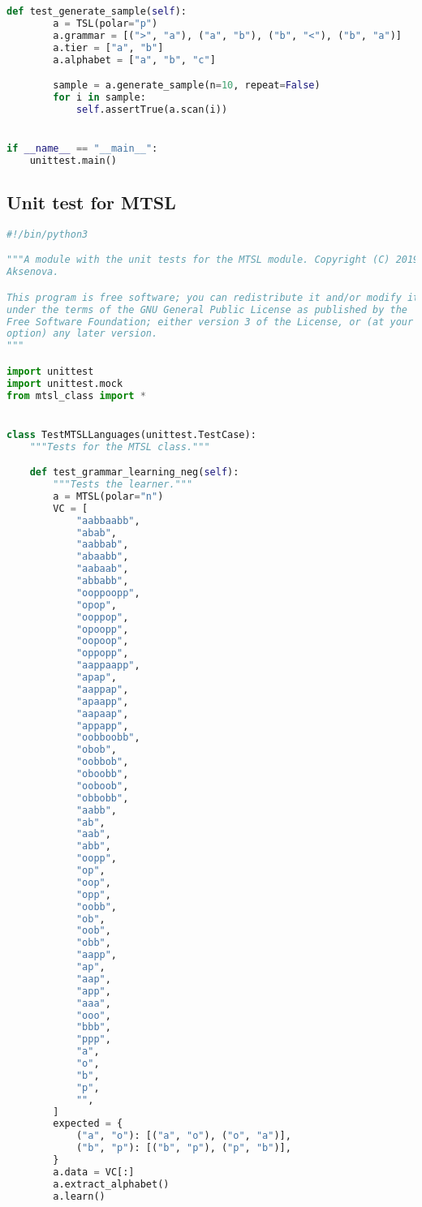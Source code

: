 \begin{lstlisting}[language=Python]
    def test_generate_sample(self):
        a = TSL(polar="p")
        a.grammar = [(">", "a"), ("a", "b"), ("b", "<"), ("b", "a")]
        a.tier = ["a", "b"]
        a.alphabet = ["a", "b", "c"]

        sample = a.generate_sample(n=10, repeat=False)
        for i in sample:
            self.assertTrue(a.scan(i))


if __name__ == "__main__":
    unittest.main()

\end{lstlisting}

\subsection*{Unit test for MTSL}

\begin{lstlisting}[language=Python]
#!/bin/python3

"""A module with the unit tests for the MTSL module. Copyright (C) 2019  Alena
Aksenova.

This program is free software; you can redistribute it and/or modify it
under the terms of the GNU General Public License as published by the
Free Software Foundation; either version 3 of the License, or (at your
option) any later version.
"""

import unittest
import unittest.mock
from mtsl_class import *


class TestMTSLLanguages(unittest.TestCase):
    """Tests for the MTSL class."""

    def test_grammar_learning_neg(self):
        """Tests the learner."""
        a = MTSL(polar="n")
        VC = [
            "aabbaabb",
            "abab",
            "aabbab",
            "abaabb",
            "aabaab",
            "abbabb",
            "ooppoopp",
            "opop",
            "ooppop",
            "opoopp",
            "oopoop",
            "oppopp",
            "aappaapp",
            "apap",
            "aappap",
            "apaapp",
            "aapaap",
            "appapp",
            "oobboobb",
            "obob",
            "oobbob",
            "oboobb",
            "ooboob",
            "obbobb",
            "aabb",
            "ab",
            "aab",
            "abb",
            "oopp",
            "op",
            "oop",
            "opp",
            "oobb",
            "ob",
            "oob",
            "obb",
            "aapp",
            "ap",
            "aap",
            "app",
            "aaa",
            "ooo",
            "bbb",
            "ppp",
            "a",
            "o",
            "b",
            "p",
            "",
        ]
        expected = {
            ("a", "o"): [("a", "o"), ("o", "a")],
            ("b", "p"): [("b", "p"), ("p", "b")],
        }
        a.data = VC[:]
        a.extract_alphabet()
        a.learn()


\end{lstlisting}
